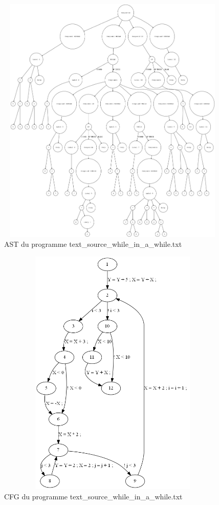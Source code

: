 \documentclass[a4paper]{article}
\begin{document}
\begin{figure}[h!]
  \centering
  \includegraphics[width=12cm,height=12cm,keepaspectratio]{input/text_source_while_in_a_while_ast.png}
  \caption{AST du programme text\_source\_while\_in\_a\_while.txt}
  \label{fig:ast4}
\end{figure}

\begin{figure}[h!]
  \centering
  \includegraphics[width=12cm,height=12cm,keepaspectratio]{input/text_source_while_in_a_while_cfg.png}
  \caption{CFG du programme text\_source\_while\_in\_a\_while.txt}
  \label{fig:cfg4}
\end{figure}
\end{document}
